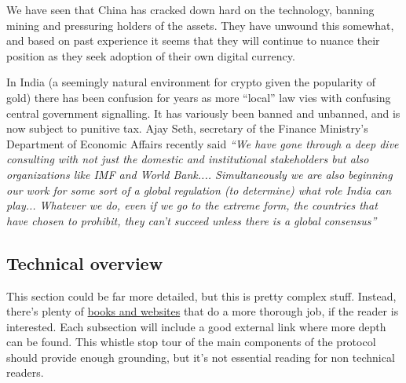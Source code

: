 We have seen that China has cracked down hard on the technology, banning mining and pressuring holders of the assets. They have unwound this somewhat, and based on past experience it seems that they will continue to nuance their position as they seek adoption of their own digital currency.\par
In India (a seemingly natural environment for crypto given the popularity of gold) there has been confusion for years as more ``local'' law vies with confusing central government signalling. It has variously been banned and unbanned, and is now subject to punitive tax. Ajay Seth, secretary of the Finance Ministry's Department of Economic Affairs recently said \textit{``We have gone through a deep dive consulting with not just the domestic and institutional stakeholders but also organizations like IMF and World Bank.... Simultaneously we are also beginning our work for some sort of a global regulation (to determine) what role India can play... Whatever we do, even if we go to the extreme form, the countries that have chosen to prohibit, they can't succeed unless there is a global consensus''}
\subsection{Technical overview}
This section could be far more detailed, but this is pretty complex stuff. Instead, there's plenty of \href{https://github.com/bitcoinbook/bitcoinbook}{books and websites} that do a more thorough job, if the reader is interested. Each subsection will include a good external link where more depth can be found. This whistle stop tour of the main components of the protocol should provide enough grounding, but it's not essential reading for non technical readers.\par
